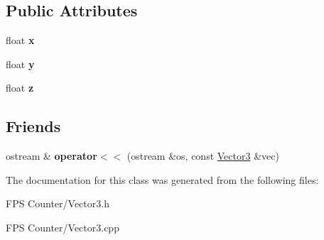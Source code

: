 \subsection*{Public Attributes}
\begin{DoxyCompactItemize}
\item 
\mbox{\label{class_vector3_a7e2d3237b29a2f29d7b3d8b2934e35f2}} 
float {\bfseries x}
\item 
\mbox{\label{class_vector3_a86eb35a9fa2d5a49e7fad66a35fa9c13}} 
float {\bfseries y}
\item 
\mbox{\label{class_vector3_aa8c9461eb24bd2c364258078811a3e9d}} 
float {\bfseries z}
\end{DoxyCompactItemize}
\subsection*{Friends}
\begin{DoxyCompactItemize}
\item 
\mbox{\label{class_vector3_af8071adba02246ed84b6ac3e3f8d4737}} 
ostream \& {\bfseries operator$<$$<$} (ostream \&os, const \mbox{\hyperlink{class_vector3}{Vector3}} \&vec)
\end{DoxyCompactItemize}


The documentation for this class was generated from the following files\+:\begin{DoxyCompactItemize}
\item 
F\+P\+S Counter/Vector3.\+h\item 
F\+P\+S Counter/Vector3.\+cpp\end{DoxyCompactItemize}
